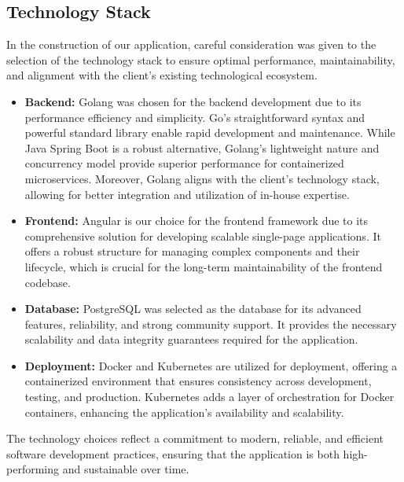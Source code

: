 \subsection{Technology Stack}

In the construction of our application, careful consideration was given to the selection of the technology stack to ensure optimal performance, maintainability, and alignment with the client's existing technological ecosystem.

\begin{itemize}
    \item \textbf{Backend:} Golang was chosen for the backend development due to its performance efficiency and simplicity.
    Go's straightforward syntax and powerful standard library enable rapid development and maintenance.
    While Java Spring Boot is a robust alternative, Golang's lightweight nature and concurrency model provide superior performance for containerized microservices.
    Moreover, Golang aligns with the client's technology stack, allowing for better integration and utilization of in-house expertise.

    \item \textbf{Frontend:} Angular is our choice for the frontend framework due to its comprehensive solution for developing scalable single-page applications.
    It offers a robust structure for managing complex components and their lifecycle, which is crucial for the long-term maintainability of the frontend codebase.

    \item \textbf{Database:} PostgreSQL was selected as the database for its advanced features, reliability, and strong community support.
    It provides the necessary scalability and data integrity guarantees required for the application.

    \item \textbf{Deployment:} Docker and Kubernetes are utilized for deployment, offering a containerized environment that ensures consistency across development, testing, and production.
    Kubernetes adds a layer of orchestration for Docker containers, enhancing the application's availability and scalability.
\end{itemize}

The technology choices reflect a commitment to modern, reliable, and efficient software development practices, ensuring that the application is both high-performing and sustainable over time.

